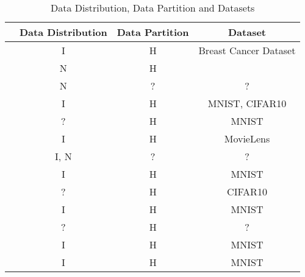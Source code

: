 \begin{table}[ht]
\centering
\caption{Data Distribution, Data Partition and Datasets}
\label{tab:data_distribution}
\begin{tabular}{c|c|c|c}
\hline \hline
                                    & Data Distribution & Data Partition & Dataset                            \\ \hline \hline
\cite{10.1145/3319535.3363256}      & I                 & H              & Breast Cancer Dataset              \\ \hline
\cite{8905038}                      & N                 & H              &                                    \\ \hline
\cite{9524833}                      & N                 & ?              & ?                                 \\ \hline
\cite{9127823}                      & I                 & H              & MNIST, CIFAR10                     \\ \hline
\cite{10.48550/arxiv.2101.03300}    & ?                 & H              & MNIST                              \\ \hline
\cite{9159643}                      & I                 & H              & MovieLens                          \\ \hline
\cite{10.1145/3422337.3447837}      & I, N              & ?              & ?                                  \\ \hline
\cite{9223754}                      & I                 & H              & MNIST                              \\ \hline
\cite{FANG20221}                    & ?                 & H              & CIFAR10                            \\ \hline
\cite{9399813}                      & I                 & H              & MNIST                              \\ \hline
\cite{9184854}                      & ?                 & H              & ?                                  \\ \hline
\cite{8851649}                      & I                 & H              & MNIST                              \\ \hline
\cite{8994206}                      & I                 & H              & MNIST                              \\ \hline

\end{tabular}
\end{table}
